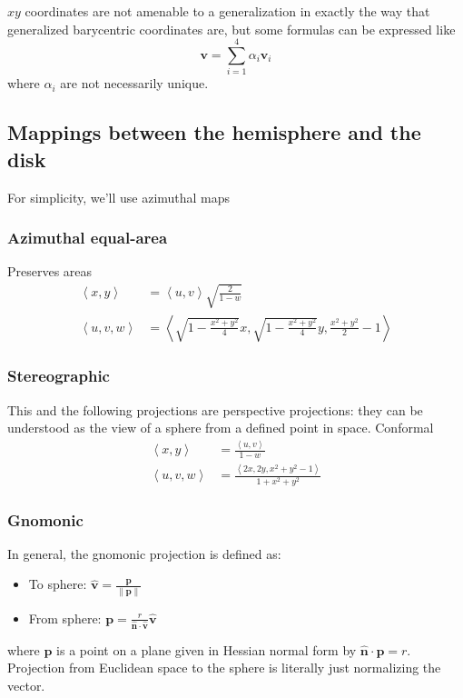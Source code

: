 \documentclass{amsart}[12pt]
\begin{document}
$xy$ coordinates are not amenable to a generalization in exactly the way that
generalized barycentric coordinates are, but some formulas can be expressed like
\begin{equation}
  \mathbf v = \sum^4_{i=1} \alpha_i \mathbf v_i
\end{equation}
where $\alpha_i$ are not necessarily unique.

\subsection{Mappings between the hemisphere and the disk}

For simplicity, we'll use azimuthal maps\cite{snyder}

\subsubsection{Azimuthal equal-area}
Preserves areas
\begin{equation}\begin{split}
  \left<x, y\right> &= \left<u, v\right> \sqrt{\frac{2}{1-w}} \\
  \left<u, v, w\right> &= \left<\sqrt{1- \frac{x^2+y^2}{4}}x,
    \sqrt{1- \frac{x^2+y^2}{4}}y, \frac{x^2+y^2}{2}-1\right>
\end{split}\end{equation}

\subsubsection{Stereographic}
This and the following projections are perspective projections: they can be
understood as the view of a sphere from a defined point in space.
Conformal
\begin{equation}\begin{split}
  \left<x, y\right> &= \frac{\left<u, v\right>}{1-w} \\
  \left<u, v, w\right> &= \frac{\left<2x, 2y, x^2+y^2-1\right>}{1+x^2+y^2}
\end{split}\end{equation}

\subsubsection{Gnomonic}
In general, the gnomonic projection is defined as:
\begin{itemize}
\item To sphere: $\hat{\mathbf v} = \frac{\mathbf p}{\|\mathbf p\|}$
\item From sphere: $\mathbf p = \frac{r}
  {\hat{\mathbf n} \cdot \hat{\mathbf v}}\hat{\mathbf v}$
\end{itemize}
where $\mathbf p$ is a point on a plane given in Hessian normal
form by $\hat{\mathbf n} \cdot \mathbf p = r$. Projection from Euclidean
space to the sphere is literally just normalizing the vector.
\end{document}
